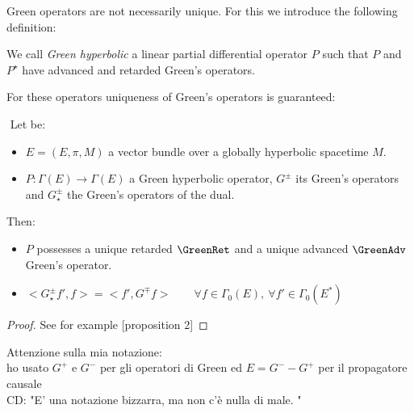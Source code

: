 \documentclass[Main]{subfiles}
\begin{document}
			Green operators are not necessarily unique. For this we introduce the following definition:
			\begin{definition}
				We call \emph{Green hyperbolic} a
				linear partial differential operator $P$ 
				such that $P$ and $P^\star$ have advanced and retarded Green’s operators.
			\end{definition}
			For these operators uniqueness of Green's operators is guaranteed:
			\begin{theorem}\label{Teo:GreenHypCharacter}
				$ $
					Let be:
					\begin{itemize}
						\item $E=(E,\pi,M)$ a vector bundle over a globally hyperbolic spacetime $M$.
						\item $P:\Gamma(E) \rightarrow \Gamma(E)$ a Green hyperbolic operator, $G^\pm$ its Green's operators and $G_\star^\pm$ the Green's operators of the dual.					
					\end{itemize}
					Then:
					\begin{itemize}
					\item $P$ possesses a unique retarded $\GreenRet$ and a unique advanced $\GreenAdv$ Green's operator.
					\item $<G_\star^\pm f', f> = <f', G^\mp f > \qquad \forall f \in \Gamma_0(E),\: \forall f' \in \Gamma_0(E^*)$
					\end{itemize}
			\end{theorem}
			\begin{proof}
			See for example \cite{Benini}[proposition 2]
			\end{proof}

\ifToninus
	\begin{Warning}
		Attenzione sulla mia notazione:\\
		ho usato $G^+$ e $G^-$ per gli operatori di Green ed $E= G^- - G^+$ per il propagatore causale\\
		CD: "E' una notazione bizzarra, ma non c'è nulla di male. "
	\end{Warning}
\fi
\end{document}
